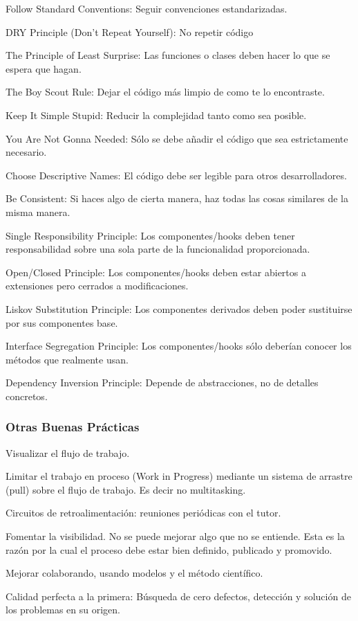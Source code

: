 \documentclass[12pt,twoside,titlepage]{report}
\begin{document}
\begin{compactitem}
    \item Follow Standard Conventions: Seguir convenciones estandarizadas.
    \item DRY Principle (Don't Repeat Yourself): No repetir código
    \item The Principle of Least Surprise: Las funciones o clases deben hacer lo que se espera que hagan.
    \item The Boy Scout Rule: Dejar el código más limpio de como te lo encontraste.
    \item Keep It Simple Stupid: Reducir la complejidad tanto como sea posible.
    \item You Are Not Gonna Needed: Sólo se debe añadir el código que sea estrictamente necesario.
    \item Choose Descriptive Names: El código debe ser legible para otros desarrolladores.
    \item Be Consistent: Si haces algo de cierta manera, haz todas las cosas similares de la misma manera.
    \item Single Responsibility Principle:  Los componentes/hooks deben tener responsabilidad sobre una sola parte de la funcionalidad proporcionada.
    \item Open/Closed Principle: Los componentes/hooks deben estar abiertos a extensiones pero cerrados a modificaciones.
    \item Liskov Substitution Principle: Los componentes derivados deben poder sustituirse por sus componentes base.
    \item Interface Segregation Principle: Los componentes/hooks sólo deberían conocer los métodos que realmente usan.
    \item Dependency Inversion Principle: Depende de abstracciones, no de detalles concretos.
\end{compactitem}

\subsubsection{Otras Buenas Prácticas}

\begin{compactitem}
    \item Visualizar el flujo de trabajo.
    \item Limitar el trabajo en proceso (Work in Progress) mediante un sistema de arrastre (pull) sobre el flujo de trabajo. Es decir no multitasking.
    \item Circuitos de retroalimentación: reuniones periódicas con el tutor.
    \item Fomentar la visibilidad. No se puede mejorar algo que no se entiende. Esta es la razón por la cual el proceso debe estar bien definido, publicado y promovido.
    \item Mejorar colaborando, usando modelos y el método científico.
    \item Calidad perfecta a la primera: Búsqueda de cero defectos, detección y solución de los problemas en su origen.
\end{compactitem}
\end{document}
